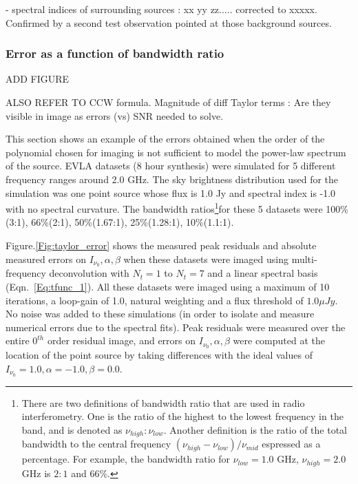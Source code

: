 \documentclass[structabstract]{stylefiles/aa}
\begin{document}
- spectral indices of surrounding sources : xx yy zz..... corrected to xxxxx. Confirmed
by a second test observation pointed at those background sources.

\subsubsection{Error as a function of bandwidth ratio}

ADD FIGURE

ALSO REFER TO CCW formula.
Magnitude of diff Taylor terms :
Are they visible in image as errors (vs) SNR needed to solve.



This section shows an example of the errors obtained when the order of the polynomial
chosen for imaging is not sufficient to model the power-law spectrum of the
source. 
EVLA datasets (8 hour synthesis) were simulated for 5 different frequency ranges
around 2.0 GHz. The sky brightness distribution used for the simulation
was one point source whose flux is 1.0 Jy and spectral index is -1.0 with
no spectral curvature.
The bandwidth ratios\footnote
{There are two definitions of bandwidth ratio that are used in radio 
interferometry. One is the ratio of the highest to the lowest frequency
in the band, and is denoted as $\nu_{high}:\nu_{low}$. Another definition
is the ratio of the total bandwidth to the central frequency 
$(\nu_{high}-\nu_{low})/\nu_{mid}$ espressed as a percentage.
For example, the bandwidth ratio for
$\nu_{low}=1.0$ GHz, $\nu_{high}=2.0$ GHz is $2:1$ and $66\%$.
}for these 5 datasets were
100\%(3:1), 66\%(2:1), 50\%(1.67:1), 25\%(1.28:1), 10\%(1.1:1).


Figure.\ref{Fig:taylor_error} shows the measured peak residuals and absolute
measured errors on $I_{\nu_0},\alpha,\beta$ when these datasets were
imaged using multi-frequency deconvolution with 
$N_t=1$ to $N_t=7$ and a linear spectral basis (Eqn.~\ref{Eq:tfunc_1}). 
%
All these datasets were imaged using a maximum of 10 iterations, a 
loop-gain of 1.0, natural weighting and a flux threshold of $1.0 \mu Jy$. No noise
was added to these simulations (in order to isolate and measure 
numerical errors due to the spectral fits).
Peak residuals were measured over the entire $0^{th}$ order
residual image, and errors on $I_{\nu_0},\alpha,\beta$ were computed
at the location of the point source by taking differences with
the ideal values of $I_{\nu_0}=1.0,\alpha=-1.0,\beta=0.0$.
\end{document}
